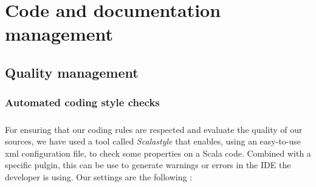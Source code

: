 \documentclass{report}
\begin{document}
\chapter{Code and documentation management}

\section{Quality management}

\subsection{Automated coding style checks}

\paragraph{}
\hspace{4mm}\textnormal{For ensuring that our coding rules are respected and evaluate the quality of our sources, we have
used a tool called \textit{Scalastyle} that enables, using an easy-to-use xml configuration file, to check
some properties on a Scala code. Combined with a specific pulgin, this can be use to generate warnings or errors
in the IDE the developer is using. Our settings are the following :}
\end{document}

